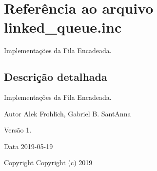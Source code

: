 \hypertarget{linked__queue_8inc}{}\section{Referência ao arquivo linked\+\_\+queue.\+inc}
\label{linked__queue_8inc}


Implementações da Fila Encadeada.  




\subsection{Descrição detalhada}
Implementações da Fila Encadeada. 

\begin{DoxyAuthor}{Autor}
Alek Frohlich, Gabriel B. Sant\textquotesingle{}Anna 
\end{DoxyAuthor}
\begin{DoxyVersion}{Versão}
1. 
\end{DoxyVersion}
\begin{DoxyDate}{Data}
2019-\/05-\/19
\end{DoxyDate}
\begin{DoxyCopyright}{Copyright}
Copyright (c) 2019 
\end{DoxyCopyright}
